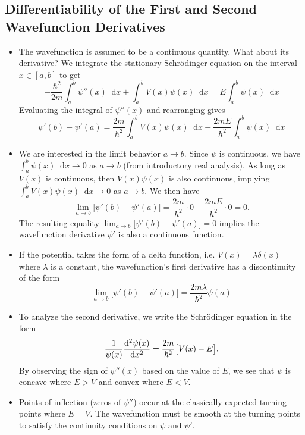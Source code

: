 \documentclass[11pt, a4paper]{article}
\newcommand{\diff}{\mathop{}\!\mathrm{d}} %
\newcommand{\Schro}{Schr\"{o}dinger\xspace}
\newcommand{\p}{\psi}  %
\begin{document}
\subsection{Differentiability of the First and Second Wavefunction Derivatives}
\begin{itemize}
	\item The wavefunction is assumed to be a continuous quantity. What about its derivative? We integrate the stationary \Schro equation on the interval $ x \in [a, b] $ to get
	\begin{equation*}
		-\frac{\hbar^{2}}{2m}\int_{a}^{b}\p''(x) \diff x + \int_{a}^{b}V(x)\p(x)\diff x = E \int_{a}^{b}\p (x) \diff x
	\end{equation*}
	Evaluating the integral of $ \psi''(x) $ and rearranging gives
	\begin{equation*}
		\psi'(b) - \psi'(a) = \frac{2m}{\hbar^{2}}\int_{a}^{b}V(x) \p(x) \diff x - \frac{2mE}{\hbar^{2}}\int_{a}^{b}\p(x)\diff x
	\end{equation*}
	
	\item We are interested in the limit behavior $ a \to b $. Since $ \p $ is continuous, we have $ \int_{a}^{b}\p(x)\diff x \to 0 $ as $ a \to b $ (from introductory real analysis). As long as $ V(x) $ is continuous, then $ V(x)\p(x) $ is also continuous, implying $ \int_{a}^{b}V(x)\p(x)\diff x \to 0 $ as $ a \to b $. We then have
	\begin{equation*}
		\lim_{a \to b} \big[\psi'(b) - \psi'(a)\big] = \frac{2m}{\hbar^{2}} \cdot 0 - \frac{2mE}{\hbar^{2}} \cdot 0 = 0.
	\end{equation*}
	The resulting equality $ \lim_{a \to b} \big[\psi'(b) - \psi'(a)\big] = 0 $ implies the wavefunction derivative $ \psi' $ is also a continuous function.
	
	\item If the potential takes the form of a delta function, i.e. $ V(x) = \lambda \delta (x) $ where $ \lambda $ is a constant, the wavefunction's first  derivative has a discontinuity of the form
	\begin{equation*}
		\lim_{a \to b} \big[\psi'(b) - \psi'(a)\big] = \frac{2m\lambda}{\hbar^{2}}\psi(a)
	\end{equation*}
	
	\item To analyze the second derivative, we write the \Schro equation in the form
	\begin{equation*}
		\frac{1}{\psi(x)} \dv[2]{\p(x)}{x} = \frac{2m}{\hbar^{2}}\big[V(x) - E\big].
	\end{equation*}
	By observing the sign of $ \psi''(x) $ based on the value of $ E $, we see that $ \p $ is concave where $ E > V $ and convex where $ E < V $. 
	
	\item Points of inflection (zeros of $ \psi'' $) occur at the classically-expected turning points where $ E = V $. The wavefunction must be smooth at the turning points to satisfy the continuity conditions on $ \p $ and $ \p' $. 
\end{itemize}
\end{document}
